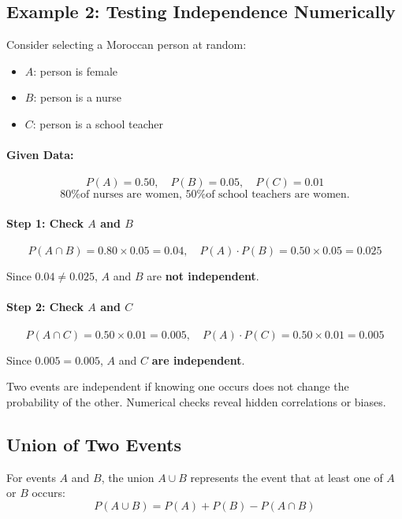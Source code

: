 \subsection{Example 2: Testing Independence Numerically}
\begin{eg}
Consider selecting a Moroccan person at random:

\begin{itemize}
    \item $A$: person is female
    \item $B$: person is a nurse
    \item $C$: person is a school teacher
\end{itemize}

\paragraph{Given Data:}
\[
P(A) = 0.50, \quad P(B) = 0.05, \quad P(C) = 0.01
\]
\[
\text{80\% of nurses are women, 50\% of school teachers are women.}
\]

\paragraph{Step 1: Check $A$ and $B$}
\[
P(A \cap B) = 0.80 \times 0.05 = 0.04, \quad P(A) \cdot P(B) = 0.50 \times 0.05 = 0.025
\]

\begin{observe}
Since $0.04 \neq 0.025$, $A$ and $B$ are \textbf{not independent}.
\end{observe}

\paragraph{Step 2: Check $A$ and $C$}
\[
P(A \cap C) = 0.50 \times 0.01 = 0.005, \quad P(A) \cdot P(C) = 0.50 \times 0.01 = 0.005
\]

\begin{observe}
Since $0.005 = 0.005$, $A$ and $C$ \textbf{are independent}.
\end{observe}
\end{eg}

\begin{intuition}
Two events are independent if knowing one occurs does not change the probability of the other. Numerical checks reveal hidden correlations or biases.
\end{intuition}

\subsection{Union of Two Events}
\begin{definition}
For events $A$ and $B$, the union $A \cup B$ represents the event that at least one of $A$ or $B$ occurs:
\[
P(A \cup B) = P(A) + P(B) - P(A \cap B)
\]
\end{definition}

